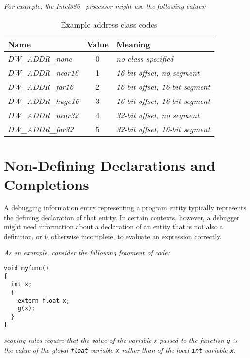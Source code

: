 \textit {For example, the Intel386 \texttrademark\  processor might use the following values:}

\begin{table}[h]
\caption{Example address class codes}
\label{tab:inteladdressclasstable}
\centering
\begin{tabular}{l|c|l}
\hline
Name&Value&Meaning  \\
\hline
\textit{DW\_ADDR\_none}&   0 & \textit{no class specified} \\
\textit{DW\_ADDR\_near16}& 1 & \textit{16-bit offset, no segment} \\
\textit{DW\_ADDR\_far16}&  2 & \textit{16-bit offset, 16-bit segment} \\
\textit{DW\_ADDR\_huge16}& 3 & \textit{16-bit offset, 16-bit segment} \\
\textit{DW\_ADDR\_near32}& 4 & \textit{32-bit offset, no segment} \\
\textit{DW\_ADDR\_far32}&  5 & \textit{32-bit offset, 16-bit segment} \\
\hline
\end{tabular}
\end{table}

\section{Non-Defining Declarations and Completions}
\label{chap:nondefiningdeclarationsandcompletions}
A debugging information entry representing a program entity
typically represents the defining declaration of that
entity. In certain contexts, however, a debugger might need
information about a declaration of an entity that is not
also a definition, or is otherwise incomplete, to evaluate
an\hypertarget{chap:DWATdeclarationincompletenondefiningorseparateentitydeclaration}{}
expression correctly.

\textit{As an example, consider the following fragment of  code:}

\begin{lstlisting}
void myfunc()
{
  int x;
  {
    extern float x;
    g(x);
  }
}
\end{lstlisting}


\textit{ scoping rules require that the 
value of the variable \texttt{x} passed to the function 
\texttt{g} is the value of the global \texttt{float} 
variable \texttt{x} rather than of the local \texttt{int} 
variable \texttt{x}.}

